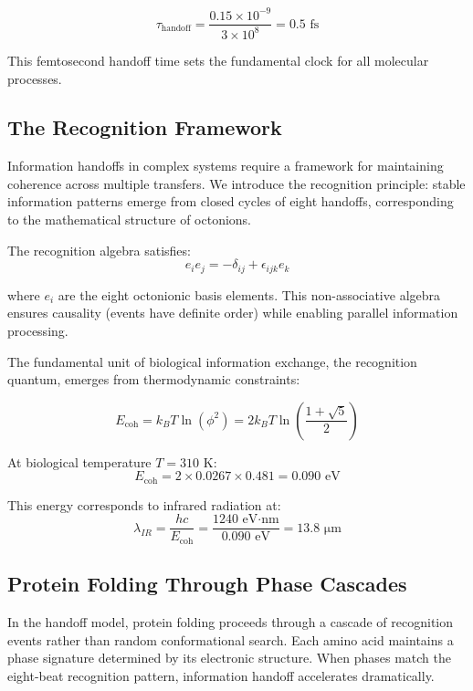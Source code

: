 \documentclass[12pt,twocolumn]{article}
\begin{document}
\begin{equation}
\tau_{\text{handoff}} = \frac{0.15 \times 10^{-9}}{3 \times 10^8} = 0.5 \text{ fs}
\end{equation}

This femtosecond handoff time sets the fundamental clock for all molecular processes.

\subsection{The Recognition Framework}

Information handoffs in complex systems require a framework for maintaining coherence across multiple transfers. We introduce the recognition principle: stable information patterns emerge from closed cycles of eight handoffs, corresponding to the mathematical structure of octonions.

The recognition algebra satisfies:
\begin{equation}
e_i e_j = -\delta_{ij} + \epsilon_{ijk} e_k
\end{equation}

where $e_i$ are the eight octonionic basis elements. This non-associative algebra ensures causality (events have definite order) while enabling parallel information processing.

The fundamental unit of biological information exchange, the recognition quantum, emerges from thermodynamic constraints:

\begin{equation}
E_{\text{coh}} = k_B T \ln(\phi^2) = 2k_B T \ln\left(\frac{1 + \sqrt{5}}{2}\right)
\end{equation}

At biological temperature $T = 310$ K:
\begin{equation}
E_{\text{coh}} = 2 \times 0.0267 \times 0.481 = 0.090 \text{ eV}
\end{equation}

This energy corresponds to infrared radiation at:
\begin{equation}
\lambda_{IR} = \frac{hc}{E_{\text{coh}}} = \frac{1240 \text{ eV·nm}}{0.090 \text{ eV}} = 13.8 \text{ μm}
\end{equation}

\subsection{Protein Folding Through Phase Cascades}

In the handoff model, protein folding proceeds through a cascade of recognition events rather than random conformational search. Each amino acid maintains a phase signature determined by its electronic structure. When phases match the eight-beat recognition pattern, information handoff accelerates dramatically.
\end{document}
